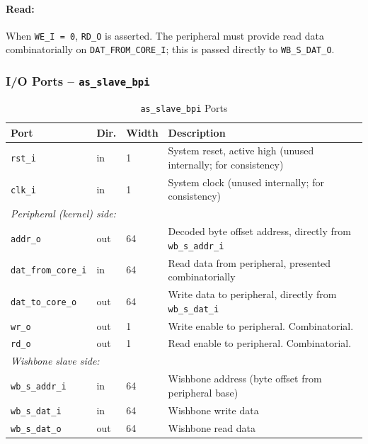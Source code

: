\paragraph{Read:}
When \texttt{WE\_I = 0}, \texttt{RD\_O} is asserted. The peripheral must provide
read data combinatorially on \texttt{DAT\_FROM\_CORE\_I}; this is passed
directly to \texttt{WB\_S\_DAT\_O}.

\subsubsection{I/O Ports -- \texttt{as\_slave\_bpi}}

\begin{table}[H]
\caption{\texttt{as\_slave\_bpi} Ports}
\label{tab:asbpi_ports}
\centering
\begin{tabularx}{\textwidth}{|l|l|l|X|}
  \hline
  Port & Dir. & Width & Description \\
  \hline\hline
  \texttt{rst\_i}             & in  & 1  & System reset, active high (unused internally; for consistency) \\
  \hline
  \texttt{clk\_i}             & in  & 1  & System clock (unused internally; for consistency) \\
  \hline
  \multicolumn{4}{|l|}{\textit{Peripheral (kernel) side:}} \\
  \hline
  \texttt{addr\_o}            & out & 64 & Decoded byte offset address, directly from \texttt{wb\_s\_addr\_i} \\
  \hline
  \texttt{dat\_from\_core\_i} & in  & 64 & Read data from peripheral, presented combinatorially \\
  \hline
  \texttt{dat\_to\_core\_o}   & out & 64 & Write data to peripheral, directly from \texttt{wb\_s\_dat\_i} \\
  \hline
  \texttt{wr\_o}              & out & 1  & Write enable to peripheral. Combinatorial. \\
  \hline
  \texttt{rd\_o}              & out & 1  & Read enable to peripheral. Combinatorial. \\
  \hline
  \multicolumn{4}{|l|}{\textit{Wishbone slave side:}} \\
  \hline
  \texttt{wb\_s\_addr\_i}     & in  & 64 & Wishbone address (byte offset from peripheral base) \\
  \hline
  \texttt{wb\_s\_dat\_i}      & in  & 64 & Wishbone write data \\
  \hline
  \texttt{wb\_s\_dat\_o}      & out & 64 & Wishbone read data \\

\end{tabularx}
\end{table}
